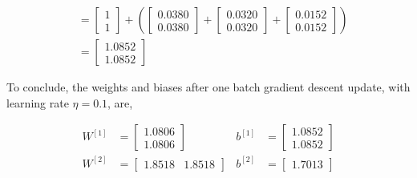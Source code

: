 \documentclass[12pt]{article}
\begin{document}
\begin{enumerate}[leftmargin=\labelsep]
$$\begin{aligned}
                                       & = \begin{bmatrix}
                                               1 \\
                                               1
                                           \end{bmatrix} + \left(
                  \begin{bmatrix}
                          0.0380 \\
                          0.0380
                      \end{bmatrix}+
                  \begin{bmatrix}
                          0.0320 \\
                          0.0320
                      \end{bmatrix}+
                  \begin{bmatrix}
                          0.0152 \\
                          0.0152
                      \end{bmatrix}
                  \right)                                                                         \\
                                       & = \begin{bmatrix}
                                               1.0852 \\
                                               1.0852
                                           \end{bmatrix}
              \end{aligned}
          $$

          To conclude, the weights and biases after one batch gradient descent update,
          with learning rate $\eta = 0.1$, are,

          $$
              \begin{aligned}
                  W^{[1]} & = \begin{bmatrix}
                                  1.0806 \\
                                  1.0806
                              \end{bmatrix} &
                  b^{[1]} & = \begin{bmatrix}
                                  1.0852 \\
                                  1.0852
                              \end{bmatrix}  \\
                  W^{[2]} & = \begin{bmatrix}
                                  1.8518 & 1.8518
                              \end{bmatrix} &
                  b^{[2]} & = \begin{bmatrix}
                                  1.7013
                              \end{bmatrix}
              \end{aligned}
          $$
\end{enumerate}
\end{document}
